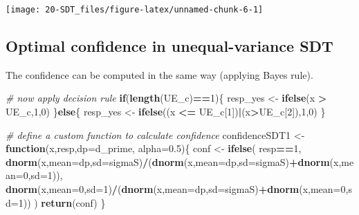 \documentclass[
]{book}
\newenvironment{Shaded}{\begin{snugshade}}{\end{snugshade}}
\newcommand{\AttributeTok}[1]{\textcolor[rgb]{0.13,0.29,0.53}{#1}}
\newcommand{\CommentTok}[1]{\textcolor[rgb]{0.56,0.35,0.01}{\textit{#1}}}
\newcommand{\ControlFlowTok}[1]{\textcolor[rgb]{0.13,0.29,0.53}{\textbf{#1}}}
\newcommand{\DecValTok}[1]{\textcolor[rgb]{0.00,0.00,0.81}{#1}}
\newcommand{\FloatTok}[1]{\textcolor[rgb]{0.00,0.00,0.81}{#1}}
\newcommand{\FunctionTok}[1]{\textcolor[rgb]{0.13,0.29,0.53}{\textbf{#1}}}
\newcommand{\NormalTok}[1]{#1}
\newcommand{\OtherTok}[1]{\textcolor[rgb]{0.56,0.35,0.01}{#1}}
\newcommand{\SpecialCharTok}[1]{\textcolor[rgb]{0.81,0.36,0.00}{\textbf{#1}}}
\begin{document}
\begin{center}\texttt{[image: 20-SDT\_files/figure-latex/unnamed-chunk-6-1]} \end{center}

\subsection{Optimal confidence in unequal-variance SDT}\label{optimal-confidence-in-unequal-variance-sdt}

The confidence can be computed in the same way (applying Bayes rule).

\begin{Shaded}
\begin{Highlighting}[]
\CommentTok{\# now apply decision rule}
\ControlFlowTok{if}\NormalTok{(}\FunctionTok{length}\NormalTok{(UE\_c)}\SpecialCharTok{==}\DecValTok{1}\NormalTok{)\{}
\NormalTok{  resp\_yes }\OtherTok{\textless{}{-}} \FunctionTok{ifelse}\NormalTok{(x }\SpecialCharTok{\textgreater{}}\NormalTok{ UE\_c,}\DecValTok{1}\NormalTok{,}\DecValTok{0}\NormalTok{)}
\NormalTok{\}}\ControlFlowTok{else}\NormalTok{\{}
\NormalTok{  resp\_yes }\OtherTok{\textless{}{-}} \FunctionTok{ifelse}\NormalTok{((x }\SpecialCharTok{\textless{}=}\NormalTok{ UE\_c[}\DecValTok{1}\NormalTok{])}\SpecialCharTok{|}\NormalTok{(x}\SpecialCharTok{\textgreater{}}\NormalTok{UE\_c[}\DecValTok{2}\NormalTok{]),}\DecValTok{1}\NormalTok{,}\DecValTok{0}\NormalTok{)}
\NormalTok{\}}


\CommentTok{\# define a custom function to calculate confidence}
\NormalTok{confidenceSDT1 }\OtherTok{\textless{}{-}} \ControlFlowTok{function}\NormalTok{(x,resp,}\AttributeTok{dp=}\NormalTok{d\_prime, }\AttributeTok{alpha=}\FloatTok{0.5}\NormalTok{)\{}
\NormalTok{  conf }\OtherTok{\textless{}{-}} \FunctionTok{ifelse}\NormalTok{(}
\NormalTok{    resp}\SpecialCharTok{==}\DecValTok{1}\NormalTok{,}
    \FunctionTok{dnorm}\NormalTok{(x,}\AttributeTok{mean=}\NormalTok{dp,}\AttributeTok{sd=}\NormalTok{sigmaS)}\SpecialCharTok{/}\NormalTok{(}\FunctionTok{dnorm}\NormalTok{(x,}\AttributeTok{mean=}\NormalTok{dp,}\AttributeTok{sd=}\NormalTok{sigmaS)}\SpecialCharTok{+}\FunctionTok{dnorm}\NormalTok{(x,}\AttributeTok{mean=}\DecValTok{0}\NormalTok{,}\AttributeTok{sd=}\DecValTok{1}\NormalTok{)),}
    \FunctionTok{dnorm}\NormalTok{(x,}\AttributeTok{mean=}\DecValTok{0}\NormalTok{,}\AttributeTok{sd=}\DecValTok{1}\NormalTok{)}\SpecialCharTok{/}\NormalTok{(}\FunctionTok{dnorm}\NormalTok{(x,}\AttributeTok{mean=}\NormalTok{dp,}\AttributeTok{sd=}\NormalTok{sigmaS)}\SpecialCharTok{+}\FunctionTok{dnorm}\NormalTok{(x,}\AttributeTok{mean=}\DecValTok{0}\NormalTok{,}\AttributeTok{sd=}\DecValTok{1}\NormalTok{))}
\NormalTok{  )}
  \FunctionTok{return}\NormalTok{(conf)}
\NormalTok{\}}


\end{Highlighting}
\end{Shaded}
\end{document}
